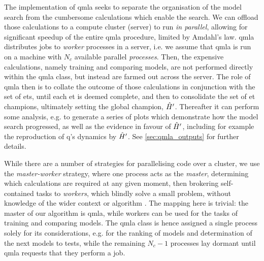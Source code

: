 The implementation of \gls{qmla} seeks to separate the organisation of the  \gls{model search}  from the 
    cumbersome calculations which enable the search. 
We can offload those calculations to a compute cluster (server) to run \emph{in parallel},
    allowing for significant speedup of the entire \gls{qmla} procedure, 
    limited by Amdahl's law. %
\gls{qmla} distributes jobs to \emph{worker} processes in a server, 
    i.e. we assume that \gls{qmla} is run on a machine with $N_c$ available parallel \emph{processes}\footnotemark. 
Then, the expensive calculations, namely training and comparing models, are not performed 
    directly within the \gls{qmla} class, but instead are farmed out across the server.
The role of \gls{qmla} then is to collate the outcome of those calculations in conjunction with the set of \glspl{et}, 
    until each \gls{et} is deemed complete, and then to consolidate the set of 
    \gls{et} champions, ultimately setting the global champion, $\hat{H}^{\prime}$. 
Thereafter it can perform some analysis, e.g. to generate a series of plots which demonstrate how the 
    model search progressed, as well as the evidence in favour of $\hat{H}^{\prime}$, including for example 
    the reproduction of \gls{q}'s dynamics by $\hat{H}^{\prime}$. 
See \cref{sec:qmla_outputs} for further details. 

\par 

While there are a number of strategies for parallelising code over a cluster, 
    we use the \emph{master-worker} strategy, where one process acts as the \emph{master}, 
    determining which calculations are required at any given moment, 
    then brokering self-contained tasks to \emph{workers}, 
    which blindly solve a small problem, without knowledge of the wider context or algorithm \cite{hockney2019parallel}.
The mapping here is trivial: the master of our algorithm is \gls{qmla}, 
    while workers can be used for the tasks of training and comparing models. 
The \gls{qmla} class is hence assigned a single process solely for its considerations, 
    e.g. for the ranking of models and determination of the next models to tests, 
    while the remaining $N_c - 1$ processes lay dormant until \gls{qmla} requests that they perform a job. 

